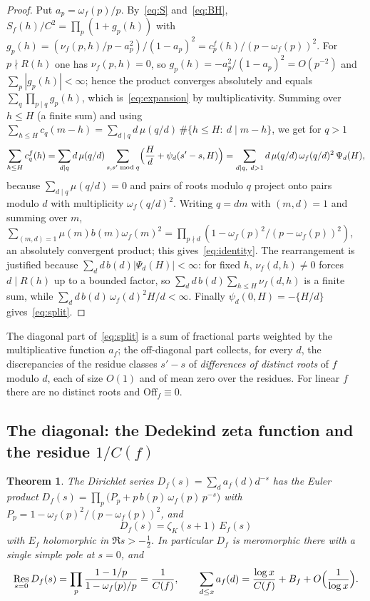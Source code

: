 \documentclass[11pt,a4paper]{article}
\newtheorem{theorem}{Theorem}
\theoremstyle{remark}\newtheorem{remark}[theorem]{Remark}
\begin{document}
\begin{proof}
Put $a_p=\omega_f(p)/p$. By~\eqref{eq:S} and~\eqref{eq:BH},
$S_f(h)/C^2=\prod_p(1+g_p(h))$ with
$g_p(h)=(\nu_f(p,h)/p-a_p^2)/(1-a_p)^2=c^f_p(h)/(p-\omega_f(p))^2$. For $p\nmid R(h)$ one has
$\nu_f(p,h)=0$, so $g_p(h)=-a_p^2/(1-a_p)^2=O(p^{-2})$ and $\sum_p|g_p(h)|<\infty$; hence the product
converges absolutely and equals $\sum_q\prod_{p\mid q}g_p(h)$, which is~\eqref{eq:expansion} by
multiplicativity. Summing over $h\le H$ (a finite sum) and using
$\sum_{h\le H}c_q(m-h)=\sum_{d\mid q}d\,\mu(q/d)\,\#\{h\le H:\ d\mid m-h\}$, we get for $q>1$
\[
\sum_{h\le H}c^f_q(h)=\sum_{d\mid q}d\,\mu(q/d)\sum_{s,s'\bmod q}\Bigl(\frac Hd+\psi_d(s'-s,H)\Bigr)
=\sum_{d\mid q,\ d>1}d\,\mu(q/d)\,\omega_f(q/d)^2\,\Psi_d(H),
\]
because $\sum_{d\mid q}\mu(q/d)=0$ and pairs of roots modulo $q$ project onto pairs modulo $d$ with
multiplicity $\omega_f(q/d)^2$. Writing $q=dm$ with $(m,d)=1$ and summing over $m$,
$\sum_{(m,d)=1}\mu(m)b(m)\omega_f(m)^2=\prod_{p\nmid d}(1-\omega_f(p)^2/(p-\omega_f(p))^2)$, an
absolutely convergent product; this gives~\eqref{eq:identity}. The rearrangement is justified because
$\sum_d d\,b(d)|\Psi_d(H)|<\infty$: for fixed $h$, $\nu_f(d,h)\ne0$ forces $d\mid R(h)$ up to a bounded
factor, so $\sum_d d\,b(d)\sum_{h\le H}\nu_f(d,h)$ is a finite sum, while
$\sum_d d\,b(d)\,\omega_f(d)^2H/d<\infty$. Finally $\psi_d(0,H)=-\{H/d\}$ gives~\eqref{eq:split}.
\end{proof}

The diagonal part of~\eqref{eq:split} is a sum of fractional parts weighted by the multiplicative
function $a_f$; the off-diagonal part collects, for every $d$, the discrepancies of the residue classes
$s'-s$ of \emph{differences of distinct roots} of $f$ modulo $d$, each of size $O(1)$ and of mean zero
over the residues. For linear $f$ there are no distinct roots and $\mathrm{Off}_f\equiv0$.

\subsection{The diagonal: the Dedekind zeta function and the residue $1/C(f)$}\label{sec:diag}

\begin{theorem}\label{thm:dirichlet}
The Dirichlet series $D_f(s)=\sum_d a_f(d)d^{-s}$ has the Euler product
$D_f(s)=\prod_p\bigl(P_p+p\,b(p)\,\omega_f(p)\,p^{-s}\bigr)$ with $P_p=1-\omega_f(p)^2/(p-\omega_f(p))^2$,
and
\[
D_f(s)=\zeta_K(s+1)\,E_f(s)
\]
with $E_f$ holomorphic in $\Re s>-\tfrac12$. In particular $D_f$ is meromorphic there with a single
simple pole at $s=0$, and
\[
\operatorname*{Res}_{s=0}D_f(s)=\prod_p\frac{1-1/p}{1-\omega_f(p)/p}=\frac1{C(f)},\qquad
\sum_{d\le x}a_f(d)=\frac{\log x}{C(f)}+B_f+O\Bigl(\frac1{\log x}\Bigr).
\]
\end{theorem}
\end{document}

